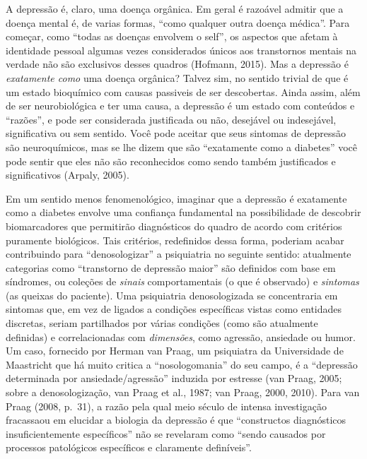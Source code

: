 A depressão é, claro, uma doença orgânica. Em geral é razoável admitir
que a doença mental é, de varias formas, ``como qualquer outra doença
médica''. Para começar, como ``todas as doenças envolvem o self'', os
aspectos que afetam à identidade pessoal algumas vezes considerados
únicos aos transtornos mentais na verdade não são exclusivos desses
quadros (Hofmann, 2015). Mas a depressão é \emph{exatamente como} uma
doença orgânica? Talvez sim, no sentido trivial de que é um estado
bioquímico com causas passiveis de ser descobertas. Ainda assim, além de
ser neurobiológica e ter uma causa, a depressão é um estado com
conteúdos e ``razões'', e pode ser considerada justificada ou não,
desejável ou indesejável, significativa ou sem sentido. Você pode
aceitar que seus sintomas de depressão são neuroquímicos, mas se lhe
dizem que são ``exatamente como a diabetes'' você pode sentir que eles
não são reconhecidos como sendo também justificados e significativos
(Arpaly, 2005).

Em um sentido menos fenomenológico, imaginar que a depressão é
exatamente como a diabetes envolve uma confiança fundamental na
possibilidade de descobrir biomarcadores que permitirão diagnósticos do
quadro de acordo com critérios puramente biológicos. Tais critérios,
redefinidos dessa forma, poderiam acabar contribuindo para
``denosologizar'' a psiquiatria no seguinte sentido: atualmente
categorias como ``transtorno de depressão maior'' são definidos com base
em síndromes, ou coleções de \emph{sinais} comportamentais (o que é
observado) e \emph{sintomas} (as queixas do paciente). Uma psiquiatria
denosologizada se concentraria em sintomas que, em vez de ligados a
condições específicas vistas como entidades discretas, seriam
partilhados por várias condições (como são atualmente definidas) e
correlacionadas com \emph{dimensões}, como agressão, ansiedade ou humor.
Um caso, fornecido por Herman van Praag, um psiquiatra da Universidade
de Maastricht que há muito critica a ``nosologomania'' do seu campo, é a
``depressão determinada por ansiedade/agressão'' induzida por estresse
(van Praag, 2005; sobre a denosologização, van Praag et al., 1987; van
Praag, 2000, 2010). Para van Praag (2008, p.~31), a razão pela qual meio
século de intensa investigação fracassaou em elucidar a biologia da
depressão é que ``constructos diagnósticos insuficientemente
específicos'' não se revelaram como ``sendo causados por processos
patológicos específicos e claramente definíveis''.

